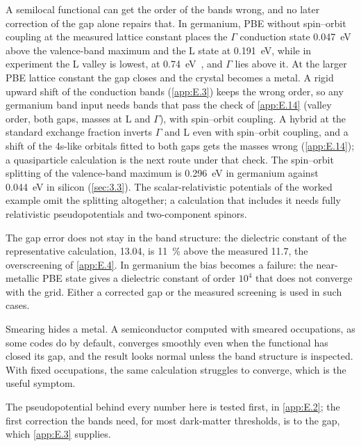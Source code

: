 A semilocal functional can get the order of the bands wrong, and no later correction of the gap alone repairs that. In germanium, PBE without spin--orbit coupling at the measured lattice constant places the $\Gamma$ conduction state \SI{0.047}{eV} above the valence-band maximum and the L state at \SI{0.191}{eV}, while in experiment the L valley is lowest, at \SI{0.74}{eV}~\cite[Table~I]{lucero2012improved}, and $\Gamma$ lies above it. At the larger PBE lattice constant the gap closes and the crystal becomes a metal. A rigid upward shift of the conduction bands (\cref{app:E.3}) keeps the wrong order, so any germanium band input needs bands that pass the check of \cref{app:E.14} (valley order, both gaps, masses at L and $\Gamma$), with spin--orbit coupling. A hybrid at the standard exchange fraction inverts $\Gamma$ and L even with spin--orbit coupling, and a shift of the 4s-like orbitals fitted to both gaps gets the masses wrong (\cref{app:E.14}); a quasiparticle calculation is the next route under that check. The spin--orbit splitting of the valence-band maximum is \SI{0.296}{eV} in germanium against \SI{0.044}{eV} in silicon (\cref{sec:3.3}). The scalar-relativistic potentials of the worked example omit the splitting altogether; a calculation that includes it needs fully relativistic pseudopotentials and two-component spinors.

The gap error does not stay in the band structure: the dielectric constant of the representative calculation, 13.04, is \SI{11}{\percent} above the measured 11.7, the overscreening of \cref{app:E.4}. In germanium the bias becomes a failure: the near-metallic PBE state gives a dielectric constant of order $10^4$ that does not converge with the grid. Either a corrected gap or the measured screening is used in such cases.

Smearing hides a metal. A semiconductor computed with smeared occupations, as some codes do by default, converges smoothly even when the functional has closed its gap, and the result looks normal unless the band structure is inspected. With fixed occupations, the same calculation struggles to converge, which is the useful symptom.

The pseudopotential behind every number here is tested first, in \cref{app:E.2}; the first correction the bands need, for most dark-matter thresholds, is to the gap, which \cref{app:E.3} supplies.
